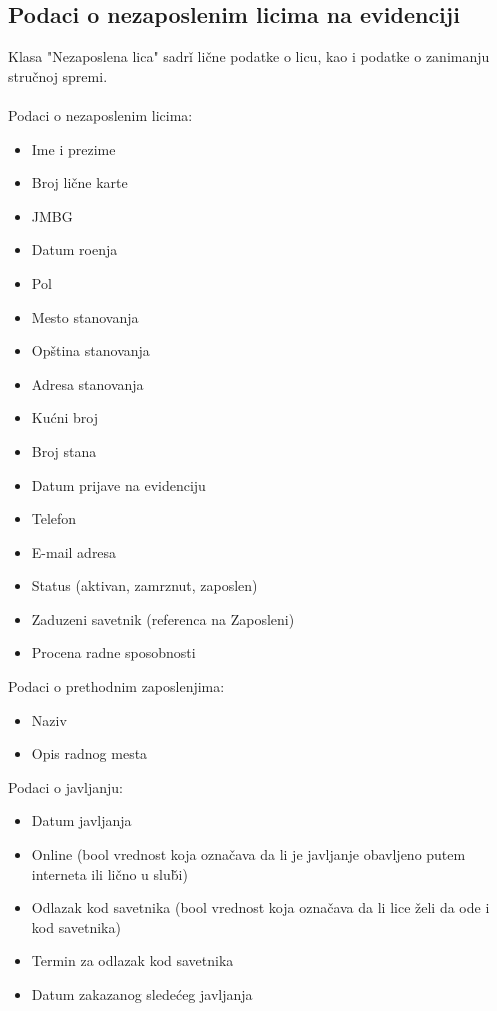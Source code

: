 \subsection{Podaci o nezaposlenim licima na evidenciji}

Klasa "Nezaposlena lica" sadr\v i li\v cne podatke o licu, kao i podatke o zanimanju stru\v cnoj spremi.
\\
\\ Podaci o nezaposlenim licima:
\begin{itemize}
	\item Ime i prezime
	\item Broj li\v cne karte
	\item JMBG
	\item Datum ro\dj enja
	\item Pol
	\item Mesto stanovanja
	\item Op\v stina stanovanja
	\item Adresa stanovanja
	\item Ku\' cni broj
	\item Broj stana 
	\item Datum prijave na evidenciju
	\item Telefon
	\item E-mail adresa
	\item Status (aktivan, zamrznut, zaposlen)
	\item Zaduzeni savetnik (referenca na Zaposleni)
	\item Procena radne sposobnosti
\end{itemize}

\noindent Podaci o prethodnim zaposlenjima:
\begin{itemize}
	\item Naziv
	\item Opis radnog mesta
\end{itemize}

\noindent Podaci o javljanju:
\begin{itemize}
	\item Datum javljanja
	\item Online (bool vrednost koja ozna\v cava da li je javljanje obavljeno putem interneta ili li\v cno u slu\v bi)
	\item Odlazak kod savetnika (bool vrednost koja ozna\v cava da li lice \v zeli da ode i kod savetnika)
	\item Termin za odlazak kod savetnika
	\item Datum zakazanog slede\' ceg javljanja
\end{itemize}

